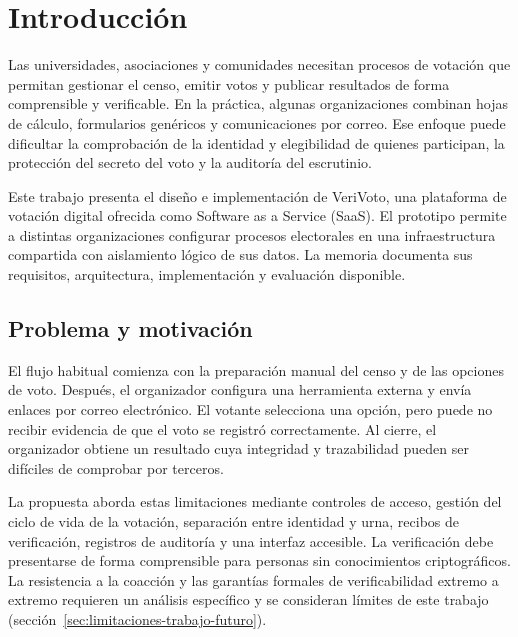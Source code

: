 
\chapter{Introducción}
\label{cap:introduccion}

Las universidades, asociaciones y comunidades necesitan procesos de votación
que permitan gestionar el censo, emitir votos y publicar resultados de forma
comprensible y verificable. En la práctica, algunas organizaciones combinan
hojas de cálculo, formularios genéricos y comunicaciones por correo. Ese
enfoque puede dificultar la comprobación de la identidad y elegibilidad de
quienes participan, la protección del secreto del voto y la auditoría del
escrutinio.

Este trabajo presenta el diseño e implementación de VeriVoto, una plataforma
de votación digital ofrecida como Software as a Service (SaaS). El prototipo
permite a distintas organizaciones configurar procesos electorales en una
infraestructura compartida con aislamiento lógico de sus datos. La memoria
documenta sus requisitos, arquitectura, implementación y evaluación disponible.

\section{Problema y motivación}
\label{sec:problema}

El flujo habitual comienza con la preparación manual del censo y de las
opciones de voto. Después, el organizador configura una herramienta externa y
envía enlaces por correo electrónico. El votante selecciona una opción, pero
puede no recibir evidencia de que el voto se registró correctamente. Al cierre,
el organizador obtiene un resultado cuya integridad y trazabilidad pueden ser
difíciles de comprobar por terceros.

La propuesta aborda estas limitaciones mediante controles de acceso, gestión
del ciclo de vida de la votación, separación entre identidad y urna, recibos de
verificación, registros de auditoría y una interfaz accesible. La verificación
debe presentarse de forma comprensible para personas sin conocimientos
criptográficos. La resistencia a la coacción y las garantías formales de
verificabilidad extremo a extremo requieren un análisis específico y se
consideran límites de este trabajo
(sección~\ref{sec:limitaciones-trabajo-futuro}).

